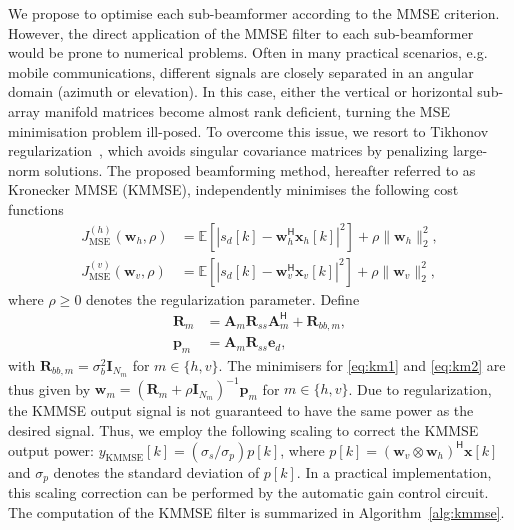 \documentclass{cta-author}
\newcommand{\bmm}[1]{\ensuremath{\mathbb{#1}}}				%
\newcommand{\hermit}{\mathsf{H}}					%
\newcommand{\Rss}{\bm{R}_{ss}}
\newcommand{\edes}{\bm{e}_{d}}
\begin{document}
We propose to optimise each sub-beamformer according to the MMSE criterion. However, the direct application of the MMSE filter to each sub-beamformer would be prone to numerical problems. Often in many practical scenarios, e.g. mobile communications, different signals are closely separated in an angular domain (azimuth or elevation). In this case, either the vertical or horizontal sub-array manifold matrices become almost rank deficient, turning the MSE minimisation problem ill-posed. To overcome this issue, we resort to Tikhonov regularization~\cite{palomar2010convex}, which avoids singular covariance matrices by penalizing large-norm solutions. The proposed beamforming method, hereafter referred to as Kronecker MMSE (KMMSE), independently minimises the following cost functions
\begin{align}
	J_\text{MSE}^{(h)}(\bm{w}_h, \rho) &= \bmm{E}\left[|s_d[k] - \bm{w}_h^\hermit \bm{x}_h[k]|^2 \right] + \rho \| \bm{w}_h \|_2^2, \label{eq:km1}\\
	J_\text{MSE}^{(v)}(\bm{w}_v, \rho) &= \bmm{E}\left[|s_d[k] - \bm{w}_v^\hermit \bm{x}_v[k]|^2 \right] + \rho \| \bm{w}_v \|_2^2, \label{eq:km2}
\end{align} 
where $\rho \geq 0$ denotes the regularization parameter. Define
\begin{align}
\bm{R}_m &= \bm{A}_m \Rss \bm{A}_m^\hermit + \bm{R}_{bb,m}, \label{eq:subcov}\\
\bm{p}_m &= \bm{A}_m \Rss \edes, \label{eq:subcrossc}
\end{align}
with $\bm{R}_{bb,m} = \sigma_b^2 \bm{I}_{N_m}$ for $m \in \{h,v\}$. The minimisers for \eqref{eq:km1} and \eqref{eq:km2} are thus given by $\bm{w}_m = (\bm{R}_m + \rho \bm{I}_{N_m})^{-1}\bm{p}_m$ for $m \in \{h,v\}$. Due to regularization, the KMMSE output signal is not guaranteed to have the same power as the desired signal. Thus, we employ the following scaling to correct the KMMSE output power: $y_{\text{KMMSE}}[k] = (\sigma_s/ \sigma_p) p[k] $, where $p[k] = (\bm{w}_v \otimes \bm{w}_h)^\hermit \bm{x}[k]$ and $\sigma_p$ denotes the standard deviation of $p[k]$. In a practical implementation, this scaling correction can be performed by the automatic gain control circuit. The computation of the KMMSE filter is summarized in Algorithm~\ref{alg:kmmse}.
\end{document}
